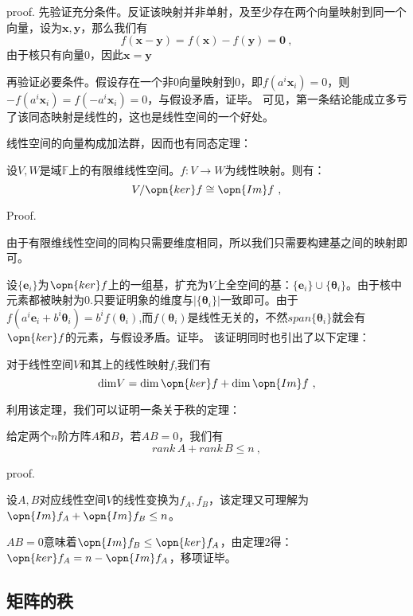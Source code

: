 proof.
先验证充分条件。反证该映射并非单射，及至少存在两个向量映射到同一个向量，设为$\boldsymbol{x,y}$，那么我们有
\begin{equation}
f(\boldsymbol{x}-\boldsymbol{y})=f(\boldsymbol x)-f(\boldsymbol y)=\boldsymbol 0~,
\end{equation}
由于核只有向量$0$，因此$\boldsymbol {x}=\boldsymbol{y}$

再验证必要条件。假设存在一个非$0$向量映射到$0$，即$f(a^i\boldsymbol x_i)=0$，则$-f(a^i\boldsymbol x_i)=f(-a^i\boldsymbol x_i)=0$，与假设矛盾，证毕。
可见，第一条结论能成立多亏了该同态映射是线性的，这也是线性空间的一个好处。

线性空间的向量构成加法群，因而也有同态定理：
\begin{theorem}{}
设$V,W$是域$\mathbb F$上的有限维线性空间。$f:V\rightarrow W$为线性映射。则有：
\begin{equation}
V/\opn{ker}f\cong \opn{Im} f~,
\end{equation}
\end{theorem}
Proof.

由于有限维线性空间的同构只需要维度相同，所以我们只需要构建基之间的映射即可。

设$\{\boldsymbol e_i\}$为$\opn{ker}f$上的一组基，扩充为$V$上全空间的基：$\{\boldsymbol e_i\}\cup \{\boldsymbol \theta_i\}$。由于核中元素都被映射为0.只要证明象的维度与$|\{\boldsymbol \theta_i\}|$一致即可。由于$f(a^i\boldsymbol e_i+b^i\boldsymbol \theta_i)=b^if(\boldsymbol \theta_i)$,而$f(\boldsymbol \theta_i)$是线性无关的，不然$span\{\boldsymbol \theta_i\}$就会有$\opn{ker}f$的元素，与假设矛盾。证毕。
该证明同时也引出了以下定理：
\begin{lemma}{}
对于线性空间$V$和其上的线性映射$f$,我们有
\begin{equation}
\mathrm{dim}V=\mathrm{dim}\,\opn{ker}f+\mathrm {dim}\,\opn{Im}f~,
\end{equation}
\end{lemma}
利用该定理，我们可以证明一条关于秩的定理：
\begin{theorem}{}
给定两个$n$阶方阵$A$和$B$，若$AB=0$，我们有
\begin{equation}
rank\,A+rank\,B\le n~,
\end{equation}
\end{theorem}
proof.

设$A,B$对应线性空间$V$的线性变换为$f_A,f_B$，该定理又可理解为$\opn{Im}f_A+\opn{Im}f_B\le n$。

$AB=0$意味着$\opn{Im}f_B\le \opn{ker}f_A$，由定理2得：$\opn{ker}f_A=n-\opn{Im}f_A$，移项证毕。
\subsection{矩阵的秩}
